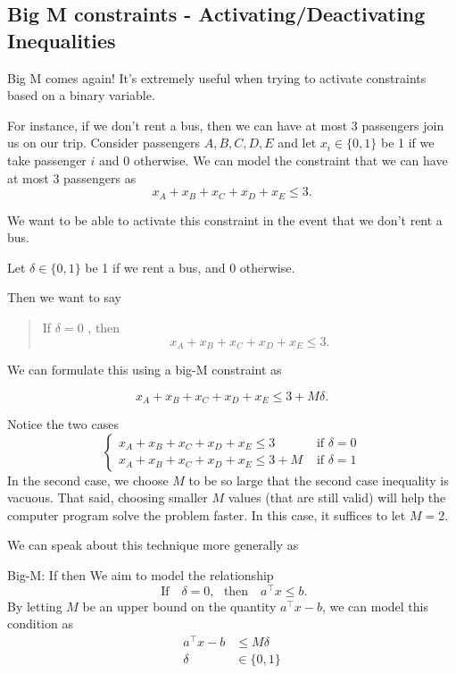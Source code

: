 \subsection{Big M constraints - Activating/Deactivating Inequalities}
\label{subsec:big-M-activation}
Big M comes again!   It's extremely useful when trying to activate constraints based on a binary variable.

For instance, if we don't rent a bus, then we can have at most 3 passengers join us on our trip.   Consider passengers $A,B,C,D,E$ and let $x_i \in \{0,1\}$ be 1 if we take passenger $i$ and 0 otherwise.
We can model the constraint that we can have at most 3 passengers as
$$
x_A + x_B + x_C + x_D + x_E \leq 3.
$$

We want to be able to activate this constraint in the event that we don't rent a bus.

Let $\delta \in \{0,1\}$ be 1 if we rent a bus, and 0 otherwise.  

Then we want to say
\begin{quote}
If $\delta = 0$ , then 
$$
x_A + x_B + x_C + x_D + x_E \leq 3.
$$
\end{quote}

We can formulate this using a big-M constraint as

\begin{equation}
x_A + x_B + x_C + x_D + x_E \leq 3 + M \delta.
\end{equation}

Notice the two cases
$$
\begin{cases}
x_A + x_B + x_C + x_D + x_E \leq 3  & \text{ if } \delta = 0\\
x_A + x_B + x_C + x_D + x_E \leq 3 +M & \text{ if } \delta = 1
\end{cases}
$$
In the second case, we choose $M$ to be so large that the second case inequality is vacuous.    That said, choosing smaller $M$ values (that are still valid) will help the computer program solve the problem faster.  In this case, it suffices to let $M = 2$.

We can speak about this technique more generally as
\begin{general}{Big-M: If then}{}{}
We aim to model the relationship
\begin{equation}
\text{ If } \ \ \   \delta = 0, \ \ \  \text{then  } \ \ \ a^\top x \leq b.
\end{equation}
By letting $M$ be an upper bound on the quantity $a^\top x - b$, we can model this condition as 
\begin{equation}
\begin{split}
a^\top x - b& \leq M\delta\\
\delta & \in \{0,1\}
\end{split}
\end{equation}
\end{general}

